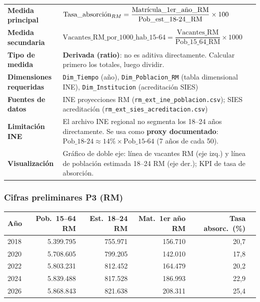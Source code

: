 \documentclass[11pt,a4paper]{article}
\begin{document}
\begin{center}
\small
\begin{tabularx}{\textwidth}{@{}>{\bfseries}p{4.2cm}Y@{}}
\toprule
Medida principal &
  $\text{Tasa\_absorción}_{RM} =
    \dfrac{\text{Matrícula\_1er\_año\_RM}}{\text{Pob\_est\_18\text{-}24\_RM}} \times 100$ \\[4pt]
Medida secundaria &
  $\text{Vacantes\_RM\_por\_1000\_hab\_{15-64}} =
    \dfrac{\text{Vacantes\_RM}}{\text{Pob\_15\_64\_RM}} \times 1000$ \\[4pt]
Tipo de medida &
  \textbf{Derivada (ratio)}: no es aditiva directamente.
  Calcular primero los totales, luego dividir. \\
Dimensiones requeridas &
  \texttt{Dim\_Tiempo} (año),
  \texttt{Dim\_Poblacion\_RM} (tabla dimensional INE),
  \texttt{Dim\_Institucion} (acreditación SIES) \\
Fuentes de datos &
  INE proyecciones RM (\texttt{rm\_ext\_ine\_poblacion.csv});
  SIES acreditación (\texttt{rm\_ext\_sies\_acreditacion.csv}) \\
Limitación INE &
  El archivo INE regional no segmenta los 18--24 años directamente.
  Se usa como \textbf{proxy documentado}: $\text{Pob\_18-24} \approx
  14\% \times \text{Pob\_15-64}$ (7 años de cada 50). \\
Visualización &
  Gráfico de doble eje: línea de vacantes RM (eje izq.) y línea de
  población estimada 18--24 RM (eje der.); KPI de tasa de absorción. \\
\bottomrule
\end{tabularx}
\end{center}

\subsubsection{Cifras preliminares P3 (RM)}

\begin{center}
\small
\begin{tabular}{@{}lrrrrr@{}}
\toprule
\textbf{Año} & \textbf{Pob.\ 15--64 RM} & \textbf{Est.\ 18--24 RM} &
\textbf{Mat.\ 1er año RM} & \textbf{Tasa absorc.\ (\%)} \\
\midrule
2018 & 5.399.795 & 755.971 & 156.710 & 20,7 \\
2020 & 5.708.605 & 799.205 & 142.010 & 17,8 \\
2022 & 5.803.231 & 812.452 & 164.479 & 20,2 \\
2024 & 5.839.488 & 817.528 & 186.993 & 22,9 \\
2026 & 5.868.843 & 821.638 & 208.311 & 25,4 \\
\bottomrule
\end{tabular}
\end{center}
\end{document}
